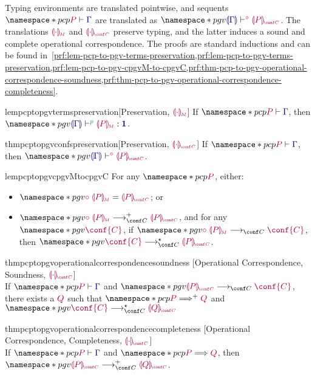 \documentclass[main.tex]{subfiles}
\begin{document}
Typing environments are translated pointwise, and sequents $\pcp{\seq{P}{\ty{\Gamma}}}$ are translated as $\pgv{\cseq[\child]{\ty{\cpgvT{\ty{\Gamma}}}}{\cpgvC{P}}}$.
The translations $\tm{\cpgvM{\cdot}}$ and $\tm{\cpgvC{\cdot}}$ preserve typing, and the latter induces a sound and complete operational correspondence. The proofs are standard inductions and can be found in~\cref{prf:lem-pcp-to-pgv-terms-preservation,prf:lem-pcp-to-pgv-terms-preservation,prf:lem-pcp-to-pgv-cpgvM-to-cpgvC,prf:thm-pcp-to-pgv-operational-correspondence-soundness,prf:thm-pcp-to-pgv-operational-correspondence-completeness}.
\begin{compacttheorems}
  \begin{restatablelemma}{lempcptopgvtermspreservation}[Preservation, ${\tm{\cpgvM{\cdot}}}$]
    \label{lem:pcp-to-pgv-terms-preservation}
    If $\pcp{\seq{P}{\ty{\Gamma}}}$, then $\pgv{\tseq[\cs{p}]{\ty{\cpgvT{\Gamma}}}{\cpgvM{P}}{\tyunit}}$.
  \end{restatablelemma}
  \begin{restatabletheorem}{thmpcptopgvconfspreservation}[Preservation, ${\tm{\cpgvC{\cdot}}}$]
    \label{thm:pcp-to-pgv-confs-preservation}
    If $\pcp{\seq{P}{\ty{\Gamma}}}$, then $\pgv{\cseq[\child]{\ty{\cpgvT{\Gamma}}}{\cpgvC{P}}}$.
  \end{restatabletheorem}
  \begin{restatablelemma}{lempcptopgvcpgvMtocpgvC}
    \label{lem:pcp-to-pgv-cpgvM-to-cpgvC}
    For any $\pcp{\tm{P}}$, either:
    \begin{itemize}
    \item $\pgv{\tm{\child\;\cpgvM{P}}=\tm{\cpgvC{P}}}$; or
    \item   $\pgv{\tm{\child\;\cpgvM{P}}\cred^+\tm{\cpgvC{P}}}$, and for any $\pgv{\tm{\conf{C}}}$, if $\pgv{\tm{\child\;\cpgvM{P}}\cred\tm{\conf{C}}}$, then $\pgv{\tm{\conf{C}}\cred^\star\tm{\cpgvC{P}}}$.
    \end{itemize}
  \end{restatablelemma}
  \begin{restatabletheorem}{thmpcptopgvoperationalcorrespondencesoundness}%
    [Operational Correspondence, Soundness, ${\tm{\cpgvC{\cdot}}}$]
    \label{thm:pcp-to-pgv-operational-correspondence-soundness}
    \hfill\\%
    If $\pcp{\seq{P}{\ty{\Gamma}}}$ and $\pgv{\tm{\cpgvC{P}}\cred\tm{\conf{C}}}$, there exists a $\tm{Q}$ such that $\pcp{\tm{P}\red^+\tm{Q}}$ and $\pgv{\tm{\conf{C}}\cred^\star\tm{\cpgvC{Q}}}$
  \end{restatabletheorem}
  \begin{restatabletheorem}{thmpcptopgvoperationalcorrespondencecompleteness}%
    [Operational Correspondence, Completeness, ${\tm{\cpgvC{\cdot}}}$]
    \label{thm:pcp-to-pgv-operational-correspondence-completeness}
    \hfill\\%
    If $\pcp{\seq{P}{\ty{\Gamma}}}$ and $\pcp{\tm{P}\red\tm{Q}}$,
    then $\pgv{\tm{\cpgvC{P}}\cred^+\tm{\cpgvC{Q}}}$.
  \end{restatabletheorem}
\end{compacttheorems}
\endgroup
\end{document}
